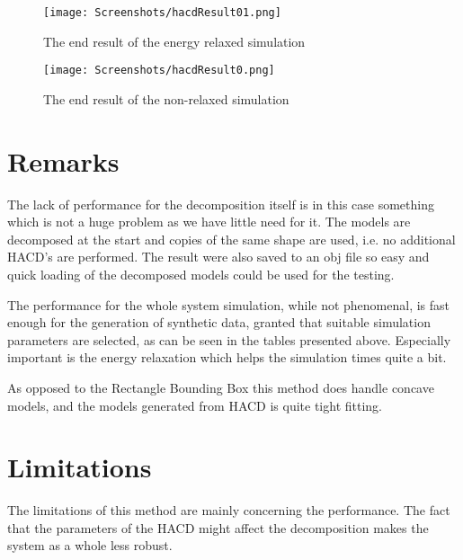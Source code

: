 \begin{figure}[H]
  \centering
  \texttt{[image: Screenshots/hacdResult01.png]}
  \caption{The end result of the energy relaxed simulation}
  \label{fig:hacd0.1}
\end{figure}

\begin{figure}[H]
  \centering
  \texttt{[image: Screenshots/hacdResult0.png]}
  \caption{The end result of the non-relaxed simulation}
  \label{fig:hacd0.0}
\end{figure}

\section{Remarks}
The lack of performance for the decomposition itself is in this case something
which is not a huge problem as we have little need for it. The models are
decomposed at the start and copies of the same shape are used, i.e. no additional
HACD's are performed. The result were also saved to an obj file so easy and quick
 loading of the decomposed models could be used for the testing.

The performance for the whole system simulation, while not phenomenal, is fast enough
for the generation of synthetic data, granted that suitable simulation parameters
are selected, as can be seen in the tables presented above. Especially important
is the energy relaxation which helps the simulation times quite a bit.

As opposed to the Rectangle Bounding Box this method does handle concave models,
and the models generated from HACD is quite tight fitting.

\section{Limitations}
The limitations of this method are mainly concerning the performance. The fact
that the parameters of the HACD might affect the decomposition makes the system
as a whole less robust.
